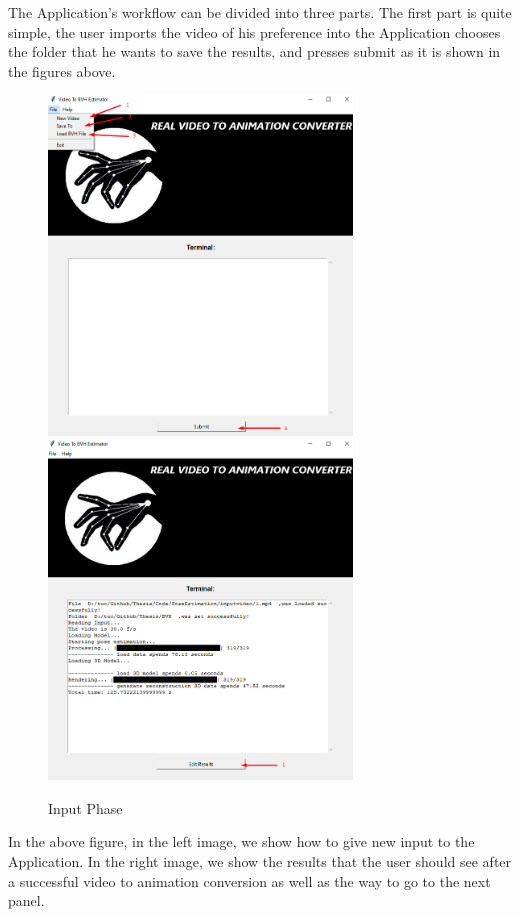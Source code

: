 The Application's workflow can be divided into three parts. The first part is quite simple, the user imports the video of his preference into the Application chooses the folder that he wants to save the results, and presses submit as it is shown in the figures above. 

\pagebreak

\begin{figure}[htp]
	\centering
	{\includegraphics[height=9cm,width=0.48\linewidth]{figures/Requirements/Workflow1_1.png}}
	\hspace{1em}%
	{\includegraphics[height=9cm, width=0.48\linewidth]{figures/Requirements/Workflow1_2.png}}
	\captionsetup{labelformat=empty}
	\caption{Input Phase}
\end{figure}

In the above figure, in the left image, we show how to give new input to the Application. In the right image, we show the results that the user should see after a successful video to animation conversion as well as the way to go to the next panel.\\\\


